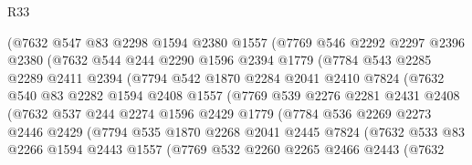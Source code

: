 \begin{lexlean}{R33}
\begin{coremodule}
              (@7632
                @547
                @83
                @2298
                @1594
                @2380
                @1557
                (@7769
                  @546
                  @2292
                  @2297
                  @2396
                  @2380
                  (@7632
                    @544
                    @244
                    @2290
                    @1596
                    @2394
                    @1779
                    (@7784
                      @543
                      @2285
                      @2289
                      @2411
                      @2394
                      (@7794
                        @542
                        @1870
                        @2284
                        @2041
                        @2410
                        @7824
                        (@7632
                          @540
                          @83
                          @2282
                          @1594
                          @2408
                          @1557
                          (@7769
                            @539
                            @2276
                            @2281
                            @2431
                            @2408
                            (@7632
                              @537
                              @244
                              @2274
                              @1596
                              @2429
                              @1779
                              (@7784
                                @536
                                @2269
                                @2273
                                @2446
                                @2429
                                (@7794
                                  @535
                                  @1870
                                  @2268
                                  @2041
                                  @2445
                                  @7824
                                  (@7632
                                    @533
                                    @83
                                    @2266
                                    @1594
                                    @2443
                                    @1557
                                    (@7769
                                      @532
                                      @2260
                                      @2265
                                      @2466
                                      @2443
                                      (@7632

\end{coremodule}
\end{lexlean}
